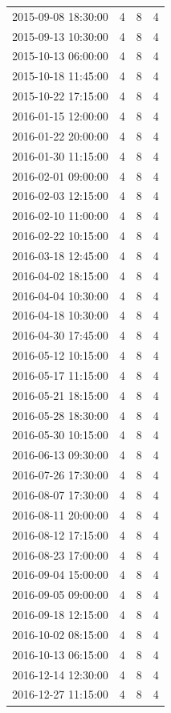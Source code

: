 \begin{tabular}{lrrr}
2015-09-08 18:30:00 & 4 & 8 & 4 \\
2015-09-13 10:30:00 & 4 & 8 & 4 \\
2015-10-13 06:00:00 & 4 & 8 & 4 \\
2015-10-18 11:45:00 & 4 & 8 & 4 \\
2015-10-22 17:15:00 & 4 & 8 & 4 \\
2016-01-15 12:00:00 & 4 & 8 & 4 \\
2016-01-22 20:00:00 & 4 & 8 & 4 \\
2016-01-30 11:15:00 & 4 & 8 & 4 \\
2016-02-01 09:00:00 & 4 & 8 & 4 \\
2016-02-03 12:15:00 & 4 & 8 & 4 \\
2016-02-10 11:00:00 & 4 & 8 & 4 \\
2016-02-22 10:15:00 & 4 & 8 & 4 \\
2016-03-18 12:45:00 & 4 & 8 & 4 \\
2016-04-02 18:15:00 & 4 & 8 & 4 \\
2016-04-04 10:30:00 & 4 & 8 & 4 \\
2016-04-18 10:30:00 & 4 & 8 & 4 \\
2016-04-30 17:45:00 & 4 & 8 & 4 \\
2016-05-12 10:15:00 & 4 & 8 & 4 \\
2016-05-17 11:15:00 & 4 & 8 & 4 \\
2016-05-21 18:15:00 & 4 & 8 & 4 \\
2016-05-28 18:30:00 & 4 & 8 & 4 \\
2016-05-30 10:15:00 & 4 & 8 & 4 \\
2016-06-13 09:30:00 & 4 & 8 & 4 \\
2016-07-26 17:30:00 & 4 & 8 & 4 \\
2016-08-07 17:30:00 & 4 & 8 & 4 \\
2016-08-11 20:00:00 & 4 & 8 & 4 \\
2016-08-12 17:15:00 & 4 & 8 & 4 \\
2016-08-23 17:00:00 & 4 & 8 & 4 \\
2016-09-04 15:00:00 & 4 & 8 & 4 \\
2016-09-05 09:00:00 & 4 & 8 & 4 \\
2016-09-18 12:15:00 & 4 & 8 & 4 \\
2016-10-02 08:15:00 & 4 & 8 & 4 \\
2016-10-13 06:15:00 & 4 & 8 & 4 \\
2016-12-14 12:30:00 & 4 & 8 & 4 \\
2016-12-27 11:15:00 & 4 & 8 & 4 \\

\end{tabular}
